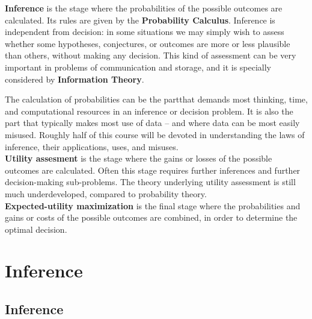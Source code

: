 \documentclass[
  a4paper,
  DIV=11,
  numbers=noendperiod,
  oneside]{scrreprt}
\begin{document}
{ \textbf{Inference}} is the stage where the probabilities
of the possible outcomes are calculated. Its rules are given by the
{\textbf{Probability Calculus}}. Inference is independent from decision:
in some situations we may simply wish to assess whether some hypotheses,
conjectures, or outcomes are more or less plausible than others, without
making any decision. This kind of assessment can be very important in
problems of communication and storage, and it is specially considered by
{\textbf{Information Theory}}.

The calculation of probabilities can be the partthat demands most
thinking, time, and computational resources in an inference or decision
problem. It is also the part that typically makes most use of data --
and where data can be most easily misused. Roughly half of this course
will be devoted in understanding the laws of inference, their
applications, uses, and misuses.\\

{ \textbf{Utility assesment}} is the stage where the gains
or losses of the possible outcomes are calculated. Often this stage
requires further inferences and further decision-making sub-problems.
The theory underlying utility assessment is still much underdeveloped,
compared to probability theory.\\

{ \textbf{Expected-utility maximization}} is the final
stage where the probabilities and gains or costs of the possible
outcomes are combined, in order to determine the optimal decision.

\part{Inference}

\hypertarget{inference-1}{%
\chapter{Inference}\label{inference-1}}

\providecommand{\ul}{\uline}
\renewcommand*{\|}[1][]{\nonscript\:#1\vert\nonscript\:\mathopen{}}
\providecommand*{\pr}[1]{\textsf{\small`#1'}}
\renewcommand*{\pr}[1]{\textsf{\small`#1'}}
\providecommand*{\prq}[1]{\textsf{\small #1}}
\renewcommand*{\prq}[1]{\textsf{\small #1}}
\providecommand{\se}[1]{\mathsfit{#1}}
\renewcommand{\se}[1]{\mathsfit{#1}}
\providecommand{\p}{\mathrm{p}}
\renewcommand{\p}{\mathrm{p}}
\renewcommand{\P}{\mathrm{P}}
\end{document}
